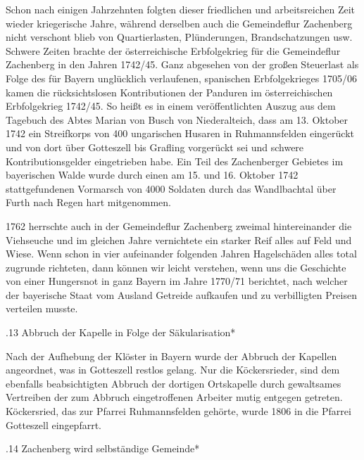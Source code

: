 Schon nach einigen Jahrzehnten folgten dieser friedlichen und arbeitsreichen
Zeit wieder kriegerische Jahre, während derselben auch die Gemeindeflur
Zachenberg nicht verschont blieb von Quartierlasten, Plünderungen,
Brandschatzungen usw. Schwere Zeiten brachte der österreichische Erbfolgekrieg
für die Gemeindeflur Zachenberg in den Jahren 1742/45. Ganz abgesehen von der
großen Steuerlast als Folge des für Bayern unglücklich verlaufenen, spanischen
Erbfolgekrieges 1705/06 kamen die rücksichtslosen Kontributionen der Panduren im
österreichischen Erbfolgekrieg 1742/45. So heißt es in einem veröffentlichten
Auszug aus dem Tagebuch des Abtes Marian von Busch von Niederalteich, dass am
13. Oktober 1742 ein Streifkorps von 400 ungarischen Husaren in Ruhmannsfelden
eingerückt und von dort über Gotteszell bis Grafling vorgerückt sei und schwere
Kontributionsgelder eingetrieben habe. Ein Teil des Zachenberger Gebietes im
bayerischen Walde wurde durch einen am 15. und 16. Oktober 1742 stattgefundenen
Vormarsch von 4000 Soldaten durch das Wandlbachtal über Furth nach Regen hart
mitgenommen.

1762 herrschte auch in der Gemeindeflur Zachenberg zweimal hintereinander die
Viehseuche und im gleichen Jahre vernichtete ein starker Reif alles auf Feld und
Wiese. Wenn schon in vier aufeinander folgenden Jahren Hagelschäden alles total
zugrunde richteten, dann können wir leicht verstehen, wenn uns die Geschichte
von einer Hungersnot in ganz Bayern im Jahre 1770/71 berichtet, nach welcher der
bayerische Staat vom Ausland Getreide aufkaufen und zu verbilligten Preisen
verteilen musste.

.13 Abbruch der Kapelle in Folge der Säkularisation*

Nach der Aufhebung der Klöster in Bayern wurde der Abbruch der Kapellen
angeordnet, was in Gotteszell restlos gelang. Nur die Köckersrieder, sind dem
ebenfalls beabsichtigten Abbruch der dortigen Ortskapelle durch gewaltsames
Vertreiben der zum Abbruch eingetroffenen Arbeiter mutig entgegen getreten.
Köckersried, das zur Pfarrei Ruhmannsfelden gehörte, wurde 1806 in die Pfarrei
Gotteszell eingepfarrt.

.14 Zachenberg wird selbständige Gemeinde*

